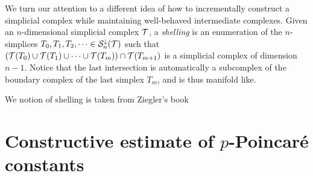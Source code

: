 \documentclass[a4paper]{article}
\begin{document}


We turn our attention to a different idea of how to incrementally construct a simplicial complex while maintaining well-behaved intermediate complexes. 
Given an $n$-dimensional simplicial complex ${\mathcal T}$, a \emph{shelling} is an enumeration of the $n$-simplices $T_{0}, T_{1}, T_{2}, \dots \in {\mathcal S}^{\downarrow}_{n}({\mathcal T})$ such that $( {\mathcal T}(T_{0}) \cup {\mathcal T}(T_{1}) \cup \dots \cup {\mathcal T}(T_{m}) ) \cap {\mathcal T}(T_{m+1})$ is a simplicial complex of dimension $n-1$. Notice that the last intersection is automatically a subcomplex of the boundary complex of the last simplex $T_{m}$, and is thus manifold like. 



We notion of shelling is taken from Ziegler's book~\cite{}


% 


\section{Constructive estimate of $p$-Poincar\'e constants}

\end{document}
